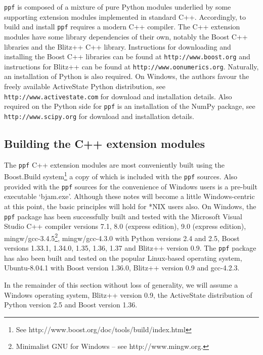 \verb|ppf| is composed of a mixture of pure Python modules underlied
by some supporting extension modules implemented in standard
C++. Accordingly, to build and install \verb|ppf| requires a modern C++
compiler. The C++ extension modules have some library dependencies of
their own, notably the Boost C++ libraries and the Blitz++ C++
library. Instructions for downloading and installing the Boost C++
libraries can be found at \verb|http://www.boost.org| and instructions
for Blitz++ can be found at
\verb|http://www.oonumerics.org|. Naturally, an installation of Python
is also required. On Windows, the authors favour the freely available
ActiveState Python distribution, see \verb|http://www.activestate.com|
for download and installation details. Also required on the Python
side for \verb|ppf| is an installation of the NumPy package, see
\verb|http://www.scipy.org| for download and installation details.

\subsection{Building the C++ extension modules}

The \verb|ppf| C++ extension modules are most conveniently built using
the Boost.Build system\footnote{See
http://www.boost.org/doc/tools/build/index.html} a copy of which is
included with the \verb|ppf| sources. Also provided with the
\verb|ppf| sources for the convenience of Windows users is a pre-built
executable `bjam.exe'. Although these notes will become a little
Windows-centric at this point, the basic principles will hold for *NIX
users also. On Windows, the \verb|ppf| package has been successfully
built and tested with the Microsoft Visual Studio C++ compiler
versions 7.1, 8.0 (express edition), 9.0 (express edition),
mingw/gcc-3.4.5\footnote{Minimalist GNU for Windows -- see
http://www.mingw.org.}, mingw/gcc-4.3.0 with Python versions 2.4 and
2.5, Boost versions 1.33.1, 1.34.0, 1.35, 1.36, 1.37 and Blitz++
version 0.9.  The \verb|ppf| package has also been built and tested on
the popular Linux-based operating system, Ubuntu-8.04.1 with Boost
version 1.36.0, Blitz++ version 0.9 and gcc-4.2.3.

In the remainder of this section without loss of generality, we will
assume a Windows operating system, Blitz++ version 0.9, the
ActiveState distribution of Python version 2.5 and Boost version 1.36.

